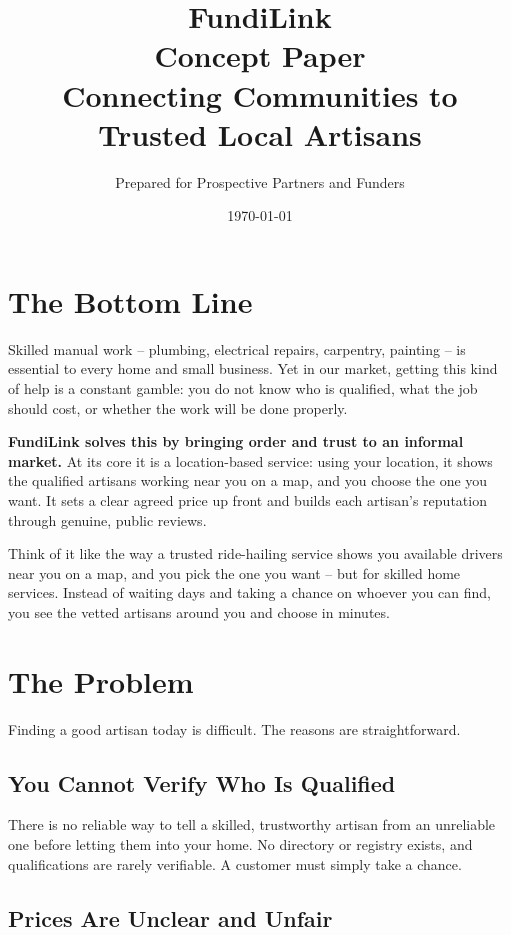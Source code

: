 \documentclass[11pt,a4paper]{article}
\title{\vspace{-1.5cm}\Huge\textbf{FundiLink}\\[0.5em]
\Large Concept Paper\\[0.3em]
\normalsize Connecting Communities to Trusted Local Artisans}
\author{Prepared for Prospective Partners and Funders}
\date{\today}
\begin{document}
\maketitle

\section{The Bottom Line}

Skilled manual work -- plumbing, electrical repairs, carpentry, painting -- is essential to
every home and small business. Yet in our market, getting this kind of help is a constant
gamble: you do not know who is qualified, what the job should cost, or whether the work will
be done properly.

\textbf{FundiLink solves this by bringing order and trust to an informal market.} At its core
it is a location-based service: using your location, it shows the qualified artisans working
near you on a map, and you choose the one you want. It sets a clear agreed price up front and
builds each artisan's reputation through genuine, public reviews.

Think of it like the way a trusted ride-hailing service shows you available drivers near you on
a map, and you pick the one you want -- but for skilled home services. Instead of waiting days
and taking a chance on whoever you can find, you see the vetted artisans around you and choose
in minutes.

\section{The Problem}

Finding a good artisan today is difficult. The reasons are straightforward.

\subsection{You Cannot Verify Who Is Qualified}

There is no reliable way to tell a skilled, trustworthy artisan from an unreliable one before
letting them into your home. No directory or registry exists, and qualifications are rarely
verifiable. A customer must simply take a chance.

\subsection{Prices Are Unclear and Unfair}
\end{document}
